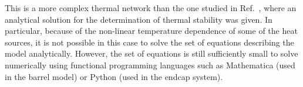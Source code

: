 This is a more complex thermal network than the one studied in Ref.~\cite{Beck:2010zzd}, where an analytical solution for the determination of thermal stability was given. In particular, because of the non-linear temperature dependence of some of the heat sources, it is not possible in this case to solve the set of equations describing the model analytically. However, the set of equations is still sufficiently small to solve numerically using functional programming languages such as Mathematica (used in the barrel model) or Python (used in the endcap system).
